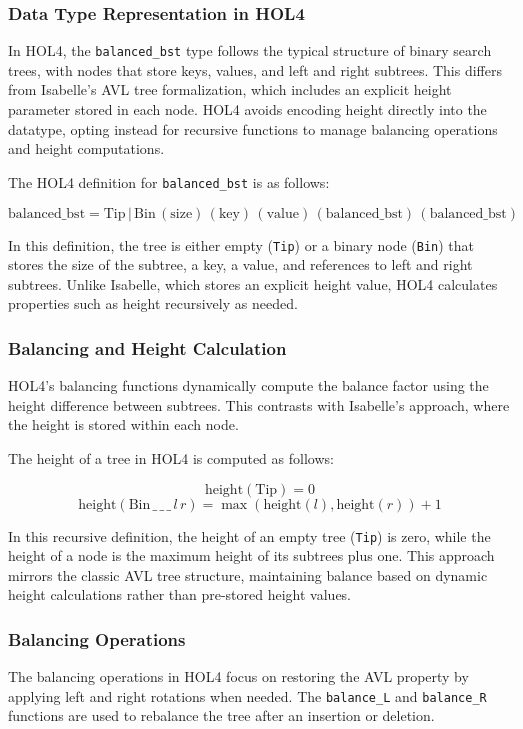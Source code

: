 \subsubsection{Data Type Representation in HOL4}
In HOL4, the \texttt{balanced\_bst} type follows the typical structure of binary search trees, with nodes that store keys, values, and left and right subtrees. This differs from Isabelle's AVL tree formalization, which includes an explicit height parameter stored in each node. HOL4 avoids encoding height directly into the datatype, opting instead for recursive functions to manage balancing operations and height computations.

The HOL4 definition for \texttt{balanced\_bst} is as follows:

\[
\text{balanced\_bst} = \text{Tip} \, | \, \text{Bin} \, (\text{size}) \, (\text{key}) \, (\text{value}) \, (\text{balanced\_bst}) \, (\text{balanced\_bst})
\]

In this definition, the tree is either empty (\texttt{Tip}) or a binary node (\texttt{Bin}) that stores the size of the subtree, a key, a value, and references to left and right subtrees. Unlike Isabelle, which stores an explicit height value, HOL4 calculates properties such as height recursively as needed.

\subsubsection{Balancing and Height Calculation}
HOL4’s balancing functions dynamically compute the balance factor using the height difference between subtrees. This contrasts with Isabelle’s approach, where the height is stored within each node.

The height of a tree in HOL4 is computed as follows:

\[
\text{height}(\text{Tip}) = 0
\]
\[
\text{height}(\text{Bin} \, \_ \, \_ \, \_ \, l \, r) = \max(\text{height}(l), \text{height}(r)) + 1
\]

In this recursive definition, the height of an empty tree (\texttt{Tip}) is zero, while the height of a node is the maximum height of its subtrees plus one. This approach mirrors the classic AVL tree structure, maintaining balance based on dynamic height calculations rather than pre-stored height values.

\subsubsection{Balancing Operations}
The balancing operations in HOL4 focus on restoring the AVL property by applying left and right rotations when needed. The \texttt{balance\_L} and \texttt{balance\_R} functions are used to rebalance the tree after an insertion or deletion.

